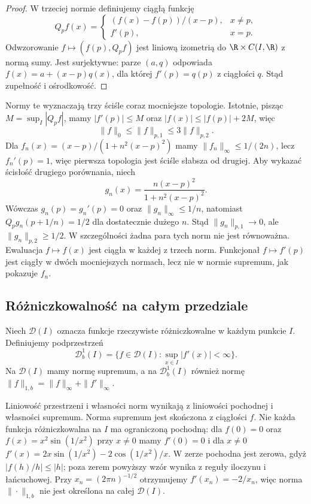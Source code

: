 \begin{proof}
W trzeciej normie definiujemy ciągłą funkcję
\[
 Q_pf(x)=
 \begin{cases}
 (f(x)-f(p))/(x-p),&x\ne p,\\
 f'(p),&x=p.
 \end{cases}
\]
Odwzorowanie $f\mapsto(f(p),Q_pf)$ jest liniową
izometrią do $\R\times C(I,\R)$ z normą sumy.
Jest surjektywne: parze $(a,q)$ odpowiada
$f(x)=a+(x-p)q(x)$, dla której $f'(p)=q(p)$
z ciągłości $q$. Stąd zupełność i ośrodkowość.
\end{proof}

Normy te wyznaczają trzy ściśle coraz mocniejsze
topologie. Istotnie, pisząc $M=\sup_I|Q_pf|$,
mamy $|f'(p)|\le M$ oraz
$|f(x)|\le |f(p)|+2M$, więc
\[
 \|f\|_0\le\|f\|_{p,1}\le3\|f\|_{p,2}.
\]
Dla $f_n(x)=(x-p)/(1+n^2(x-p)^2)$ mamy
$\|f_n\|_\infty\le1/(2n)$, lecz $f_n'(p)=1$,
więc pierwsza topologia jest ściśle słabsza od drugiej.
Aby wykazać ścisłość drugiego porównania, niech
\[
 g_n(x)=\frac{n(x-p)^2}{1+n^2(x-p)^2}.
\]
Wówczas $g_n(p)=g_n'(p)=0$ oraz
$\|g_n\|_\infty\le1/n$, natomiast
$Q_pg_n(p+1/n)=1/2$ dla dostatecznie dużego $n$.
Stąd $\|g_n\|_{p,1}\to0$, ale
$\|g_n\|_{p,2}\ge1/2$. W szczególności żadna
para tych norm nie jest równoważna.
Ewaluacja $f\mapsto f(x)$ jest ciągła w każdej
z trzech norm. Funkcjonał $f\mapsto f'(p)$
jest ciągły w dwóch mocniejszych normach,
lecz nie w normie supremum, jak pokazuje $f_n$.

\subsection{Różniczkowalność na całym przedziale}

\begin{definicja}
\label{ma2:def:everywhere-differentiable-space}
Niech $\mathcal D(I)$ oznacza funkcje rzeczywiste
różniczkowalne w każdym punkcie $I$.
Definiujemy podprzestrzeń
\[
 \mathcal D_b^1(I)=
 \{f\in\mathcal D(I):\sup_{x\in I}|f'(x)|<\infty\}.
\]
Na $\mathcal D(I)$ mamy normę supremum, a na
$\mathcal D_b^1(I)$ również normę
$\|f\|_{1,b}=\|f\|_\infty+\|f'\|_\infty$.
\end{definicja}

Liniowość przestrzeni i własności norm wynikają
z liniowości pochodnej i własności supremum.
Norma supremum jest skończona z ciągłości $f$.
Nie każda funkcja różniczkowalna na $I$ ma
ograniczoną pochodną: dla $f(0)=0$ oraz
$f(x)=x^2\sin(1/x^2)$ przy $x\ne0$ mamy
$f'(0)=0$ i dla $x\ne0$
$f'(x)=2x\sin(1/x^2)-2\cos(1/x^2)/x$.
W zerze pochodna jest zerowa, gdyż
$|f(h)/h|\le|h|$; poza zerem powyższy wzór
wynika z reguły iloczynu i łańcuchowej.
Przy $x_n=(2\pi n)^{-1/2}$ otrzymujemy
$f'(x_n)=-2/x_n$, więc norma $\|\cdot\|_{1,b}$
nie jest określona na całej $\mathcal D(I)$.


